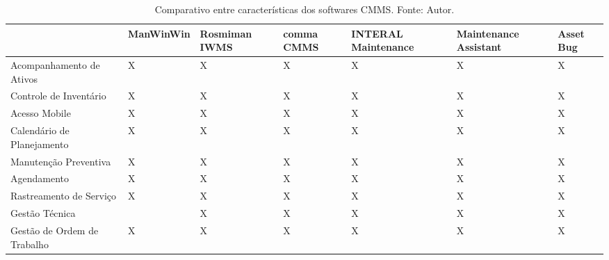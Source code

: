 \begin{landscape}
\begin{table}[H]
\centering
\caption{Comparativo entre características dos softwares CMMS. Fonte: Autor.}
\label{comparativo}
\begin{tabular}{ | p{6cm} | p{3cm} | p{2cm} | p{2cm} | p{3cm} | p{3cm} | p{2cm} | }
\hline
	      & ManWinWin & Rosmiman IWMS & comma CMMS & INTERAL Maintenance & Maintenance Assistant & Asset Bug \\ \hline
	Acompanhamento de Ativos & X & X & X & X & X & X \\ \hline
	Controle de Inventário & X & X & X & X & X & X \\ \hline
	Acesso Mobile & X & X & X & X & X & X \\ \hline
	Calendário de Planejamento & X & X & X & X & X & X \\ \hline
	Manutenção Preventiva & X & X & X & X & X & X \\ \hline
	Agendamento & X & X & X & X & X & X \\ \hline
	Rastreamento de Serviço & X & X & X & X & X & X \\ \hline
	Gestão Técnica &  & X & X & X & X & X \\ \hline
	Gestão de Ordem de Trabalho & X & X & X & X & X & X \\ \hline
\end{tabular}
\end{table}
\end{landscape}

